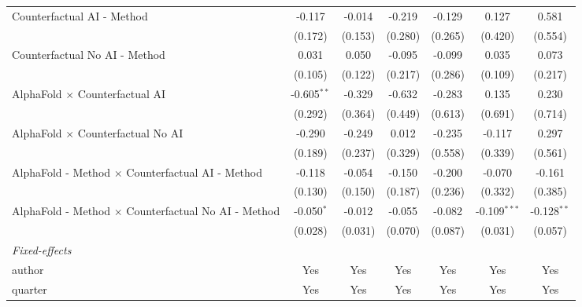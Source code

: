 \begin{tabular}{lcccccc}
   Counterfactual AI - Method                                 & -0.117        & -0.014        & -0.219  & -0.129  & 0.127          & 0.581\\   
                                                              & (0.172)       & (0.153)       & (0.280) & (0.265) & (0.420)        & (0.554)\\   
   Counterfactual No AI - Method                              & 0.031         & 0.050         & -0.095  & -0.099  & 0.035          & 0.073\\   
                                                              & (0.105)       & (0.122)       & (0.217) & (0.286) & (0.109)        & (0.217)\\   
   AlphaFold $\times$ Counterfactual AI                       & -0.605$^{**}$ & -0.329        & -0.632  & -0.283  & 0.135          & 0.230\\   
                                                              & (0.292)       & (0.364)       & (0.449) & (0.613) & (0.691)        & (0.714)\\   
   AlphaFold $\times$ Counterfactual No AI                    & -0.290        & -0.249        & 0.012   & -0.235  & -0.117         & 0.297\\   
                                                              & (0.189)       & (0.237)       & (0.329) & (0.558) & (0.339)        & (0.561)\\   
   AlphaFold - Method $\times$ Counterfactual AI - Method     & -0.118        & -0.054        & -0.150  & -0.200  & -0.070         & -0.161\\   
                                                              & (0.130)       & (0.150)       & (0.187) & (0.236) & (0.332)        & (0.385)\\   
   AlphaFold - Method $\times$ Counterfactual No AI - Method  & -0.050$^{*}$  & -0.012        & -0.055  & -0.082  & -0.109$^{***}$ & -0.128$^{**}$\\   
                                                              & (0.028)       & (0.031)       & (0.070) & (0.087) & (0.031)        & (0.057)\\   
   \midrule
   \emph{Fixed-effects}\\
   author                                                     & Yes           & Yes           & Yes     & Yes     & Yes            & Yes\\  
   quarter                                                    & Yes           & Yes           & Yes     & Yes     & Yes            & Yes\\  

\end{tabular}
